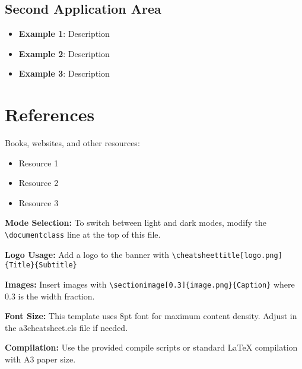 \documentclass[darkmode]{a3cheatsheet}
\begin{document}
\begin{multicols}{3}
\subsection{Second Application Area}

\begin{itemize}
    \item \textbf{Example 1}: Description
    \item \textbf{Example 2}: Description
    \item \textbf{Example 3}: Description
\end{itemize}

\section{References}

\begin{infobox}
Books, websites, and other resources:
\begin{itemize}
    \item Resource 1
    \item Resource 2
    \item Resource 3
\end{itemize}
\end{infobox}

\begin{notebox}
\textbf{Mode Selection:} To switch between light and dark modes, modify the \verb|\documentclass| line at the top of this file.

\textbf{Logo Usage:} Add a logo to the banner with \verb|\cheatsheettitle[logo.png]{Title}{Subtitle}|

\textbf{Images:} Insert images with \verb|\sectionimage[0.3]{image.png}{Caption}| where 0.3 is the width fraction.

\textbf{Font Size:} This template uses 8pt font for maximum content density. Adjust in the a3cheatsheet.cls file if needed.

\textbf{Compilation:} Use the provided compile scripts or standard LaTeX compilation with A3 paper size.
\end{notebox}

\end{multicols}
\end{document}
